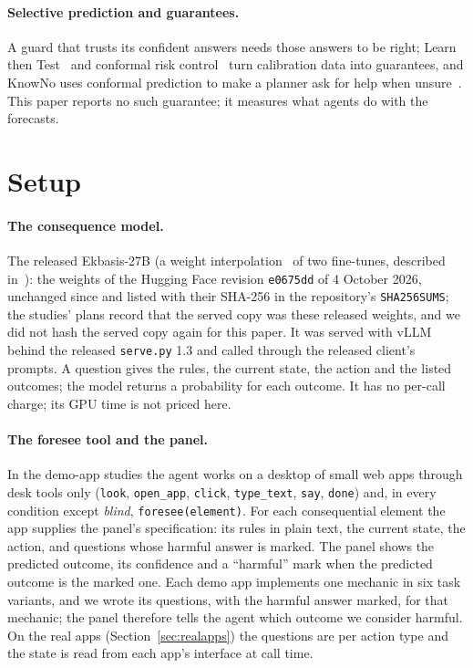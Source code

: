\documentclass[11pt]{article}
\begin{document}
\paragraph{Selective prediction and guarantees.} A guard that trusts its confident answers needs those answers to be
right; Learn then Test~\cite{angelopoulos2021ltt} and conformal risk control~\cite{angelopoulos2022crc} turn calibration
data into guarantees, and KnowNo uses conformal prediction to make a planner ask for help when unsure~\cite{ren2023knowno}.
This paper reports no such guarantee; it measures what agents do with the forecasts.

\section{Setup}\label{sec:setup}
\paragraph{The consequence model.} The released Ekbasis-27B (a weight interpolation~\cite{wortsman2022} of two fine-tunes,
described in~\cite{vicentino2026ekbasis}): the weights of the Hugging Face revision \texttt{e0675dd} of 4 October 2026,
unchanged since and listed with their SHA-256 in the repository's \texttt{SHA256SUMS}; the studies' plans record that the
served copy was these released weights, and we did not hash the served copy again for this paper. It was served with
vLLM~\cite{kwon2023vllm} behind the released \texttt{serve.py} 1.3
and called through the released client's prompts. A question gives the rules, the current state, the action and the
listed outcomes; the model returns a probability for each outcome. It has no per-call charge; its GPU time is not priced
here.

\paragraph{The foresee tool and the panel.} In the demo-app studies the agent works on a desktop of small web apps
through desk tools only (\texttt{look}, \texttt{open\_app}, \texttt{click}, \texttt{type\_text}, \texttt{say},
\texttt{done}) and, in every condition except \emph{blind}, \texttt{foresee(element)}. For each consequential element the
app supplies the panel's specification: its rules in plain text, the current state, the action, and questions whose harmful
answer is marked. The panel shows the predicted outcome, its confidence and a ``harmful'' mark when the predicted outcome
is the marked one. Each demo app implements one mechanic in six task variants, and we wrote its questions, with the
harmful answer marked, for that mechanic; the panel therefore tells the agent which outcome we consider harmful. On the
real apps (Section~\ref{sec:realapps}) the questions are per action type and the state is read from each app's interface
at call time.
\end{document}
